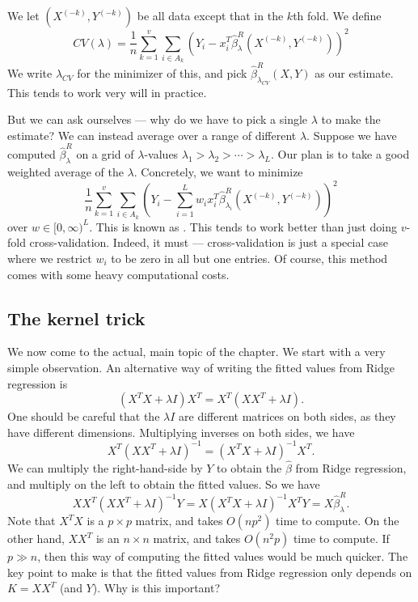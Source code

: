 \documentclass[a4paper]{article}
\begin{document}
We let $(X^{(-k)}, Y^{(-k)})$ be all data except that in the $k$th fold. We define
\[
  CV(\lambda) = \frac{1}{n} \sum_{k = 1}^v \sum_{i \in A_k} (Y_i - x_i^T \hat{\beta}_\lambda^R (X^{(-k)}, Y^{(-k)}))^2
\]
We write $\lambda_{CV}$ for the minimizer of this, and pick $\hat{\beta}^R_{\lambda_{CV}}(X, Y)$ as our estimate. This tends to work very will in practice.

But we can ask ourselves --- why do we have to pick a single $\lambda$ to make the estimate? We can instead average over a range of different $\lambda$. Suppose we have computed $\hat{\beta}_\lambda^R$ on a grid of $\lambda$-values $\lambda_1 > \lambda_2 > \cdots > \lambda_L$. Our plan is to take a good weighted average of the $\lambda$. Concretely, we want to minimize
\[
  \frac{1}{n} \sum_{k = 1}^v \sum_{i \in A_k} \left(Y_i - \sum_{i = 1}^L w_i x_i^T \hat{\beta}_{\lambda_i}^R (X^{(-k)}, Y^{(-k)})\right)^2
\]
over $w \in [0, \infty)^L$. This is known as . This tends to work better than just doing $v$-fold cross-validation. Indeed, it must --- cross-validation is just a special case where we restrict $w_i$ to be zero in all but one entries. Of course, this method comes with some heavy computational costs.

\subsection{The kernel trick}
We now come to the actual, main topic of the chapter. We start with a very simple observation. An alternative way of writing the fitted values from Ridge regression is
\[
  (X^T X + \lambda I) X^T = X^T(XX^T + \lambda I).
\]
One should be careful that the $\lambda I$ are different matrices on both sides, as they have different dimensions. Multiplying inverses on both sides, we have
\[
  X^T(XX^T + \lambda I)^{-1} = (X^T X + \lambda I)^{-1} X^T.
\]
We can multiply the right-hand-side by $Y$ to obtain the $\hat{\beta}$ from Ridge regression, and multiply on the left to obtain the fitted values. So we have
\[
  XX^T(XX^T + \lambda I)^{-1}Y = X (X^T X + \lambda I)^{-1} X^T Y = X \hat{\beta}^R_\lambda.
\]
Note that $X^T X$ is a $p \times p$ matrix, and takes $O(np^2)$ time to compute. On the other hand, $XX^T$ is an $n \times n$ matrix, and takes $O(n^2 p)$ time to compute. If $p \gg n$, then this way of computing the fitted values would be much quicker. The key point to make is that the fitted values from Ridge regression only depends on $K = XX^T$ (and $Y$). Why is this important?
\end{document}
